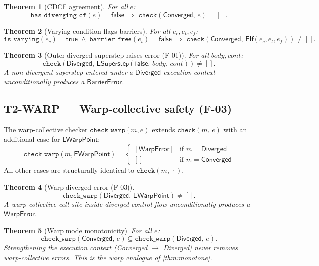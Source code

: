 \documentclass[11pt,a4paper]{article}
\theoremstyle{definition}
\theoremstyle{plain}
\newtheorem{theorem}{Theorem}[section]
\theoremstyle{remark}
\newcommand{\Converged}{\mathsf{Converged}}
\newcommand{\Diverged}{\mathsf{Diverged}}
\newcommand{\chk}[2]{\mathtt{check}(#1,\,#2)}
\newcommand{\isvarying}[1]{\mathtt{is\_varying}(#1)}
\newcommand{\barrierfree}[1]{\mathtt{barrier\_free}(#1)}
\newcommand{\cdcf}[1]{\mathtt{has\_diverging\_cf}(#1)}
\newcommand{\incl}{\subseteq}
\begin{document}
\begin{theorem}[CDCF agreement]
  \label{thm:cdcf-clean}
  For all $e$:
  \[
    \cdcf{e} = \mathsf{false}
    \;\Rightarrow\;
    \chk{\Converged}{e} = [].
  \]
\end{theorem}

\begin{theorem}[Varying condition flags barriers]
  \label{thm:varying-flags}
  For all $e_c, e_t, e_f$:
  \[
    \isvarying{e_c} = \mathsf{true}
    \;\land\;
    \barrierfree{e_t} = \mathsf{false}
    \;\Rightarrow\;
    \chk{\Converged}{\mathsf{EIf}(e_c, e_t, e_f)} \ne [].
  \]
\end{theorem}

\begin{theorem}[Outer-diverged superstep raises error (F-01)]
  \label{thm:superstep-outer-diverged}
  For all $\mathit{body}, \mathit{cont}$:
  \[
    \chk{\Diverged}{\mathsf{ESuperstep}(\mathsf{false},\,\mathit{body},\,\mathit{cont})} \ne [].
  \]
  A non-divergent superstep entered under a $\Diverged$ execution context
  unconditionally produces a $\mathsf{BarrierError}$.
\end{theorem}

\subsection{T2-WARP --- Warp-collective safety (F-03)}
\label{sec:warp-props}

The warp-collective checker $\mathtt{check\_warp}(m, e)$ extends $\chk{m}{e}$
with an additional case for $\mathsf{EWarpPoint}$:
\[
  \mathtt{check\_warp}(m, \mathsf{EWarpPoint}) =
  \begin{cases}
    [\mathsf{WarpError}] & \text{if } m = \Diverged \\
    [] & \text{if } m = \Converged
  \end{cases}
\]
All other cases are structurally identical to $\chk{m}{\cdot}$.

\begin{theorem}[Warp-diverged error (F-03)]
  \label{thm:warp-diverged-error}
  \[
    \mathtt{check\_warp}(\Diverged,\,\mathsf{EWarpPoint}) \ne [].
  \]
  A warp-collective call site inside diverged control flow unconditionally
  produces a $\mathsf{WarpError}$.
\end{theorem}

\begin{theorem}[Warp mode monotonicity]
  \label{thm:warp-mode-monotone}
  For all $e$:
  \[
    \mathtt{check\_warp}(\Converged,\,e) \incl \mathtt{check\_warp}(\Diverged,\,e).
  \]
  Strengthening the execution context (Converged $\to$ Diverged) never removes
  warp-collective errors. This is the warp analogue of \cref{thm:monotone}.
\end{theorem}
\end{document}
